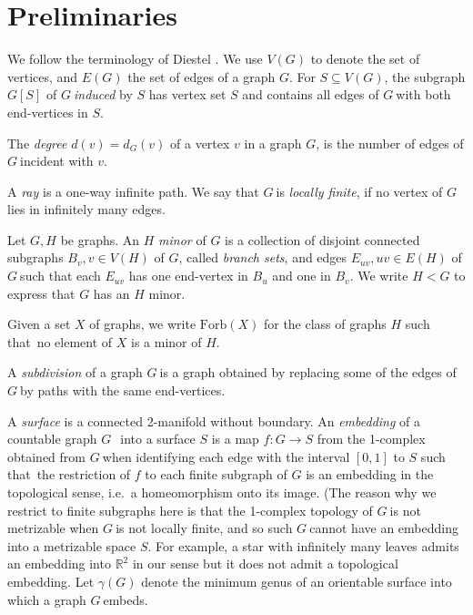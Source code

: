 \documentclass{article}
\newcommand{\forb}[1]{\mathrm{Forb}(#1)}
\newcommand{\defi}[1]{{\color{darkgray}\emph{#1}}}
\newcommand{\R}{\ensuremath{\mathbb R}}
\newcommand{\g}{\ensuremath{G\ }}
\newcommand{\G}{\ensuremath{G}}
\newcommand{\lf}{locally finite}
\newcommand{\st}{such that}
\newcommand{\DB}{\cite{diestelBook05}}
\begin{document}
\section{Preliminaries} \label{prels}



We follow the terminology of Diestel \DB. We use $V(G)$ to denote the set of vertices, and $E(G)$ the set of edges of a graph \G. For $S\subseteq V(G)$, the subgraph $G[S]$ of \g \defi{induced} by $S$ has vertex set $S$ and contains all edges of \g with both end-vertices in $S$.

The \defi{degree} $d(v)=d_G(v)$ of a vertex $v$ in a graph \G, is the number of edges of \g incident with $v$. 

A \defi{ray} is a one-way infinite path. We say that \g is \defi{\lf}, if no vertex of \g lies in infinitely many edges.

\medskip

Let $G,H$ be graphs. An $H$ \defi{minor} of $G$ is a collection of disjoint connected subgraphs $B_v, v\in V(H)$ of $G$, called \defi{branch sets}, 
and edges $E_{uv}, uv\in E(H)$ of \g such that each $E_{uv}$ has one end-vertex in $B_u$ and one in $B_v$. We write $H<G$ to express that $G$ has an $H$ minor.







Given a set $X$ of graphs, we write $\forb{X}$ for the class of graphs $H$ \st\ no element of $X$ is a minor of $H$. 

A \defi{subdivision} of a graph \g is a graph obtained by replacing some of the edges of \g by paths with the same end-vertices. 

\medskip

A \defi{surface} is a connected 2-manifold without boundary.  An \defi{embedding}  of a countable graph \g\ into a surface $S$ is a map $f: G \to S$ from the 1-complex obtained from \g when identifying each edge with the interval $[0,1]$ to  $S$  \st\ the restriction of $f$ to each finite subgraph of $G$ is an embedding in the topological sense, i.e.\ a homeomorphism onto its image. (The reason why we restrict to finite subgraphs here is that the 1-complex topology of \g is not metrizable when \g is not \lf, and so such \g cannot have an embedding into a metrizable space $S$. For example, a star with infinitely many leaves admits an embedding into $\R^2$ in our sense but it does not admit a topological embedding. Let $\gamma(G)$ denote the minimum genus of an orientable surface into which a graph \g embeds.
\end{document}
